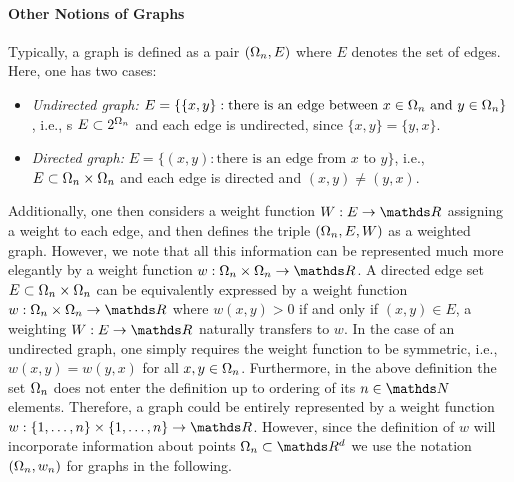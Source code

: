 \paragraph{Other Notions of Graphs}
Typically, a graph is defined as a pair $(\Omega_n,E)$ where $E$ denotes the set of edges. Here, 
one has two cases:
\begin{itemize}
\item \emph{Undirected graph:} $E=\{ \{x,y\}: \text{there is an edge between } x\in \Omega_n \text{ and } y\in \Omega_n\}$, i.e., s
$E\subset 2^{\Omega_n}$ and each edge is undirected, since $\{x,y\}=\{y,x\}$.
%
\item \emph{Directed graph:} $E=\{ (x,y): \text{there is an edge from } x \text{ to } y\}$, i.e.,
$E\subset \Omega_n\times \Omega_n$ and each edge is directed and $(x,y)\neq(y,x)$.
%
\end{itemize}
Additionally, one then considers a weight function $W:E\to\R$ assigning a weight to each edge, and then defines 
the triple $(\Omega_n,E,W)$ as a weighted graph. However, we note that all this information can be represented much more elegantly by a weight function $w:\domain_n\times \domain_n\to\R$. A directed edge set $E\subset \Omega_n\times \Omega_n$ can be equivalently expressed by 
a weight function $w:\domain_n\times \domain_n\to\R$ where $w(x,y)>0$ if and only if $(x,y)\in E$, a weighting $W:E\to\R$ 
naturally transfers to $w$. In the case of an undirected graph, one simply requires the weight function to be symmetric, i.e., 
$w(x,y)=w(y,x)$ for all $x,y\in \Omega_n$.
%
Furthermore, in the above definition the set $\Omega_n$ does not enter the definition up to ordering of its $n\in \N$  elements. Therefore, a graph could be entirely represented by a weight function $w:\{1,\ldots,n\}\times\{1,\ldots,n\}\to\R$. However, since the definition of $w$ will incorporate information about points $\domain_n\subset\R^d$ we use the notation $(\Omega_n, w_n)$ for graphs in the following.
%
%
%
